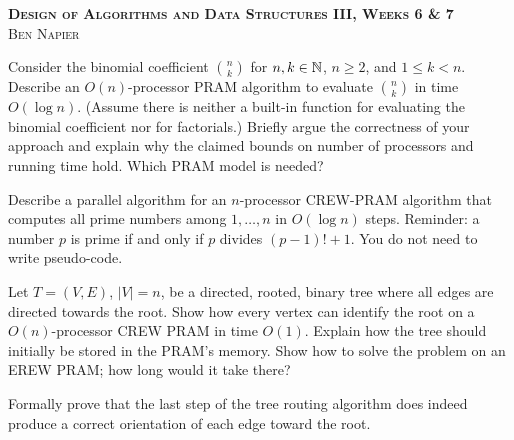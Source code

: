 \documentclass[a4paper, answers]{exam}
\begin{document}
\begin{center}
	\textbf{\textsc{Design of Algorithms and Data Structures III, 
	Weeks 6 \& 7}} \\
	\textsc{Ben Napier}
	\vspace{1em}
\end{center}

\begin{questions}
	\question 
	Consider the binomial coefficient $\binom nk$ for $n,k \in \mathbb{N}$,
	$n \geq 2$, and $1 \leq k < n$.
	Describe an $O(n)$-processor PRAM algorithm to evaluate $\binom nk$
	in time $O(\log n)$.
	(Assume there is neither a built-in function for evaluating the binomial
	coefficient nor for factorials.)
	Briefly argue the correctness of your approach and explain why the claimed
	bounds on number of processors and running time hold.
	Which PRAM model is needed?

	\question 
	Describe a parallel algorithm for an $n$-processor
	CREW-PRAM algorithm that computes all prime numbers among $1, \ldots, n$
	in $O(\log n)$ steps.
	Reminder: a number $p$ is prime if and only if $p$ divides
	$(p-1)! + 1$.
	You do not need to write pseudo-code.

	\question
	Let $T = (V,E)$,
	$\left\lvert V \right\rvert = n$, be a directed, rooted, binary tree
	where all edges are directed towards the root.
	Show how every vertex can identify the root on a $O(n)$-processor
	CREW PRAM in time $O(1)$.
	Explain how the tree should initially be stored in the PRAM's memory.
	Show how to solve the problem on an EREW PRAM; how long would it take there?

	\question
	Formally prove that the last step of the tree routing algorithm does indeed
	produce a correct orientation of each edge toward the root.
\end{questions}
\end{document}

